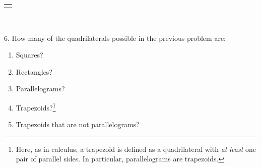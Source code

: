 \documentclass[10pt,]{book}
\theoremstyle{plain}
\theoremstyle{definition}
\theoremstyle{definition}
\theoremstyle{definition}
\theoremstyle{definition}
\numberwithin{equation}{chapter}
\newlength{\panelmax}
\begin{document}
\begin{exerciselist}
{%
\setlength{\panelmax}{0pt}
\ifdefined\panelboxAimage\else\newsavebox{\panelboxAimage}\fi%
\begin{lrbox}{\panelboxAimage}
\end{lrbox}
\ifdefined\phAimage\else\newlength{\phAimage}\fi%
\setlength{\phAimage}{\ht\panelboxAimage+\dp\panelboxAimage}
\settototalheight{\phAimage}{\usebox{\panelboxAimage}}
\setlength{\panelmax}{\maxof{\panelmax}{\phAimage}}
\leavevmode%
\setlength{\tabcolsep}{0\linewidth}
\par\medskip\noindent
\hspace*{0.23\linewidth}%
\begin{tabular}{@{}*{1}{c}@{}}
\begin{minipage}[c][\panelmax][t]{0.54\linewidth}\usebox{\panelboxAimage}\end{minipage}\end{tabular}\\
}%
\par\smallskip
\item[6.]\hypertarget{exercise-116}{}\hypertarget{p-947}{}%
How many of the quadrilaterals possible in the previous problem are: \leavevmode%
\begin{enumerate}[label=(\alph*)]
\item\hypertarget{li-440}{}\hypertarget{p-948}{}%
Squares?%
\item\hypertarget{li-441}{}\hypertarget{p-949}{}%
Rectangles?%
\item\hypertarget{li-442}{}\hypertarget{p-950}{}%
Parallelograms?%
\item\hypertarget{li-443}{}\hypertarget{p-951}{}%
Trapezoids?\footnote{Here, as in calculus, a trapezoid is defined as a quadrilateral with \emph{at least} one pair of parallel sides.  In particular, parallelograms are trapezoids.\label{fn-6}}%
\item\hypertarget{li-444}{}\hypertarget{p-952}{}%
Trapezoids that are not parallelograms?%
\end{enumerate}

\end{exerciselist}
\end{document}
